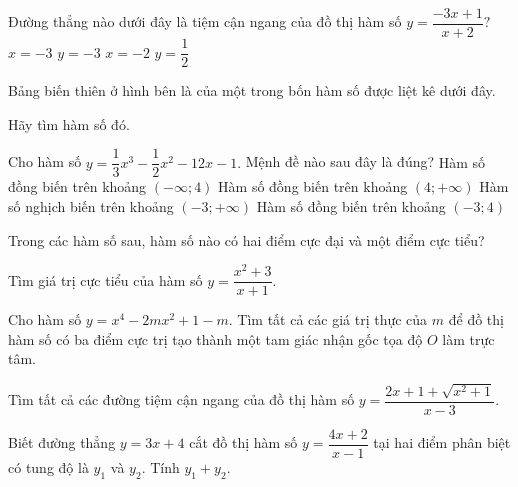 \documentclass[12pt,a4paper]{article}
\begin{document}
\begin{ex}%
Đường thẳng nào dưới đây là tiệm cận ngang của đồ thị hàm số $y=\dfrac{-3x+1}{x+2}?$
\choice
{$x=-3$}
{\True $y=-3$}
{$x=-2$}
{$y=\dfrac{1}{2}$}
\end{ex}

\begin{ex}%
Bảng biến thiên ở hình bên là của một trong bốn hàm số được liệt kê dưới đây.
\begin{center}
\end{center} Hãy tìm hàm số đó.
\end{ex}
\begin{ex}%
Cho hàm số $y=\dfrac{1}{3}x^3-\dfrac{1}{2}x^2-12x-1.$ Mệnh đề nào sau đây là đúng?
\choice
{Hàm số đồng biến trên khoảng $(-\infty;4)$}
{\True Hàm số đồng biến trên khoảng $(4;+\infty)$}
{Hàm số nghịch biến trên khoảng $(-3;+\infty)$}
{Hàm số đồng biến trên khoảng $(-3;4)$}
\end{ex}
\begin{ex}%
Trong các hàm số sau, hàm số nào có hai điểm cực đại và một điểm cực tiểu?
\end{ex}
\begin{ex}%
Tìm giá trị cực tiểu của hàm số $y=\dfrac{x^2+3}{x+1}.$
\end{ex}
\begin{ex}%
Cho hàm số $y=x^4-2mx^2+1-m.$ Tìm tất cả các giá trị thực của $m$ để đồ thị hàm số có ba điểm cực trị tạo thành một tam giác nhận gốc tọa độ $O$ làm trực tâm.
\end{ex}
\begin{ex}%
Tìm tất cả các đường tiệm cận ngang của đồ thị hàm số $y=\dfrac{2x+1+\sqrt{x^2+1}}{x-3}.$
\end{ex}
\begin{ex}%
Biết đường thẳng $y=3x+4$ cắt đồ thị hàm số $y=\dfrac{4x+2}{x-1}$ tại hai điểm phân biệt có tung độ là $y_1$ và $y_2$. Tính $y_1+y_2.$
\end{ex}
\end{document}
